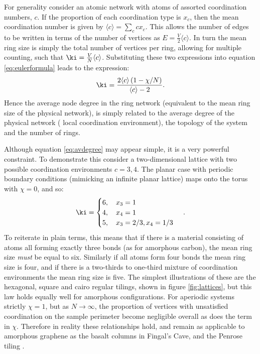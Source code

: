 For generality consider an atomic network with atoms of assorted coordination numbers, $c$. 
If the proportion of each coordination type is $x_c$, then the mean coordination number is given by $\langle c \rangle = \sum\limits_c cx_c$.
This allows the number of edges to be written in terms of the number of vertices as $E=\frac{V}{2}\langle c \rangle$. 
In turn the mean ring size is simply the total number of vertices per ring, allowing for multiple counting, such that $\ki=\frac{V}{N}\langle c \rangle$.
Substituting these two expressions into equation \eqref{eq:eulerformula} leads to the expression:
\begin{equation}
	\label{eq:avdegree}
	\ki = \frac{2\langle c \rangle\left(1-\chi/N\right)}{\langle c \rangle - 2}.
\end{equation}
Hence the average node degree in the ring network (equivalent to the mean ring size of the physical network), is simply related to the average degree of the physical network (\ie{} local coordination environment), the topology of the system and the number of rings.

Although equation \eqref{eq:avdegree} may appear simple, it is a very powerful constraint. 
To demonstrate this consider a two\--dimensional lattice with two possible coordination environments $c=3,4$. 
The planar case with periodic boundary conditions (mimicking an infinite planar lattice) maps onto the torus with $\chi=0$, and so:
\begin{equation}
	\label{eq:2dplanarcases}
	\ki = \begin{cases}
		6, \quad x_3 = 1 \\
		4, \quad x_4 = 1 \\
		5, \quad x_3 = 2/3, x_4 =1/3
	\end{cases}\,.
\end{equation}
To reiterate in plain terms, this means that if there is a material consisting of atoms all forming exactly three bonds (as for amorphous carbon), the mean ring size \textit{must} be equal to six. 
Similarly if all atoms form four bonds the mean ring size is four, and if there is a two\--thirds to one\--third mixture of coordination environments the mean ring size is five.
The simplest illustrations of these are the hexagonal, square and cairo regular tilings, shown in figure \ref{fig:lattices}, but this law holds equally well for amorphous configurations.
For aperiodic systems strictly $\chi=1$, but as $N\rightarrow \infty$, the proportion of vertices with unsatisfied coordination on the sample perimeter become negligible overall as does the term in $\chi$.
Therefore in reality these relationships hold, and remain as applicable to amorphous graphene as the basalt columns in Fingal's Cave, and the Penrose tiling \cite{Goehring2014,Ressouche2009}.

